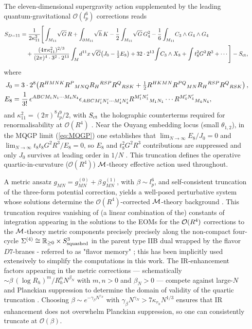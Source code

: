 \documentclass[a4paper,11pt,fleqn]{article}
\theoremstyle{plain}
\theoremstyle{definition}
\begin{document}
The eleven-dimensional supergravity action supplemented by the leading quantum-gravitational
$\mathcal{O}(l_p^6)$ corrections reads
\cite{Duff:1995wd,Green:1997di,Green:1997as,Russo:1997mk,Antoniadis:1997eg,Tseytlin:2000sf,Liu:2013dna}
\begin{align}
S_{D=11} &= \frac{1}{2\kappa_{11}^2}\Bigg[
  \int_{M_{11}}\!\sqrt{G}\,R
  + \int_{\partial M_{11}}\!\sqrt{h}\,K
  - \frac{1}{2}\int_{M_{11}}\!\sqrt{G}\,G_4^2
  - \frac{1}{6}\int_{M_{11}}\!C_3 \wedge G_4 \wedge G_4 \notag\\
&\quad + \frac{(4\pi\kappa_{11}^2)^{2/3}}{(2\pi)^4 \cdot 3^2 \cdot 2^{13}}
  \int_M \!d^{11}x\,\sqrt{G}\!\left(J_0 - \tfrac{1}{2}E_8\right)
  + 32\cdot 2^{13}\!\int\! C_3 \wedge X_8
  + \int t_8^2 G^2 R^3
  + \cdots\Bigg] - S_{\rm ct},
\label{eq:11daction}
\end{align}
where
\begin{align}
J_0 &= 3\cdot 2^8\!\left(
  R^{HMNK}R^P{}_{MNQ}R_H{}^{RSP}R^Q{}_{RSK}
  + \tfrac{1}{2}R^{HKMN}R^{PQ}{}_{MN}R_H{}^{RSP}R^Q{}_{RSK}
\right), \notag\\
E_8 &= \frac{1}{3!}\,\epsilon^{ABCM_1N_1\cdots M_4N_4}
       \epsilon_{ABCM'_1N'_1\cdots M'_4N'_4}
       R^{M'_1N'_1}{}_{M_1N_1}\cdots R^{M'_4N'_4}{}_{M_4N_4},
\end{align}
and $\kappa_{11}^2 = (2\pi)^8 l_p^9/2$, with $S_{\rm ct}$ the holographic counterterms
required for renormalisability at $\mathcal{O}(R^4)$ \cite{Gopal+Vikas+Aalok}. Near the Ouyang
embedding locus (small $\theta_{1,2}$), in the MQGP limit (\ref{eq:MQGP}) one establishes that
$\lim_{N\to\infty}E_8/J_0 = 0$ and $\lim_{N\to\infty}t_8 t_8 G^2 R^3/E_8 = 0$, so $E_8$
and $t_8^2 G^2 R^3$ contributions are suppressed and only $J_0$ survives at leading order
in $1/N$ \cite{OR4}. This truncation defines the operative
quartic-in-curvature ($\mathcal{O}(R^4)$) ${\cal M}$-theory effective action used throughout.

A metric ansatz $g_{MN} = g^{(0)}_{MN} + \beta\, g^{(1)}_{MN}$, with $\beta \sim l_p^6$,
and self-consistent truncation of the three-form potential correction, yields a well-posed
perturbative system whose solutions determine the $\mathcal{O}(R^4)$-corrected ${\cal M}$-theory
background \cite{OR4}. This truncation requires vanishing of (a linear combination of the) constants of integration appearing in the solutions to the EOMs for the ${\cal O}(R^4)$ corrections to the ${\cal M}$-theory metric components  precisely precisely along the non-compact four-cycle $\Sigma^{(4)}\cong \mathbb{R}_{\geq0}\times S^3_{\rm squashed}$ in the parent type IIB dual wrapped by the flavor $D7$-branes - referred to as "flavor memory" \cite{Gopal+Vikas+Aalok}; this has been implicitly used extensively to simplify the computations in this work. The IR-enhancement factors appearing in the metric
corrections --- schematically $\sim \beta\,(\log R_h)^m/R_h^n N^{\beta_N}$ with $m,n > 0$
and $\beta_N > 0$ --- compete against large-$N$ and Planckian suppression to determine the
domain of validity of the quartic truncation \cite{IITR-McGill-bulk-viscosity}. Choosing
$\beta \sim e^{-\gamma_\beta N^{\gamma_N}}$ with
$\gamma_\beta N^{\gamma_N} > 7\kappa_{r_h}N^{1/3}$ ensures that IR enhancement does not
overwhelm Planckian suppression, so one can consistently truncate at $\mathcal{O}(\beta)$.
\end{document}
